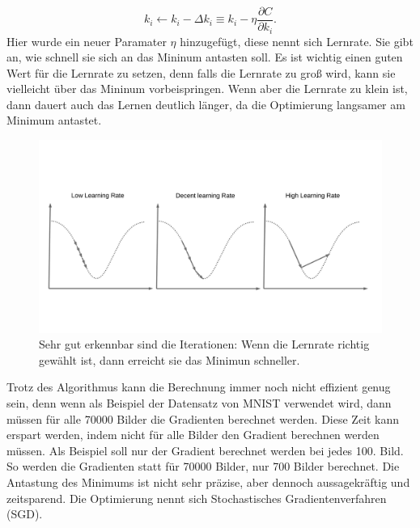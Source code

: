 \documentclass[11pt]{article}
\begin{document}
\begin{equation}
    k_i \leftarrow k_i - \Delta k_i \equiv  k_i - \eta \frac{\partial C}{\partial k_{i}}.
\end{equation}
Hier wurde ein neuer Paramater $\eta$ hinzugefügt, diese nennt sich Lernrate. Sie gibt an, wie schnell sie sich an das Mininum antasten soll.
Es ist wichtig einen guten Wert für die Lernrate zu setzen, denn falls die Lernrate zu groß wird, kann sie vielleicht über das Mininum vorbeispringen.
Wenn aber die Lernrate zu klein ist, dann dauert auch das Lernen deutlich länger, da die Optimierung langsamer am Minimum antastet.
\begin{figure}[h]
    \centering
    \includegraphics[width=400pt, keepaspectratio]{images/lrate}
    \caption[Einstellen der Lernrate]{Sehr gut erkennbar sind die Iterationen: Wenn die Lernrate richtig gewählt ist, dann erreicht sie das Minimun schneller.}
\end{figure}
Trotz des Algorithmus kann die Berechnung immer noch nicht effizient genug sein, denn wenn als
Beispiel der Datensatz von MNIST verwendet wird, dann müssen für alle 70000 Bilder die Gradienten berechnet werden. Diese Zeit kann erspart werden,
indem nicht für alle Bilder den Gradient berechnen werden müssen. Als Beispiel soll nur der Gradient berechnet werden bei jedes 100. Bild. So werden die Gradienten statt
für 70000 Bilder, nur 700 Bilder berechnet. Die Antastung des Minimums ist nicht sehr präzise, aber dennoch aussagekräftig und zeitsparend. Die
Optimierung nennt sich Stochastisches Gradientenverfahren (SGD).
\end{document}
